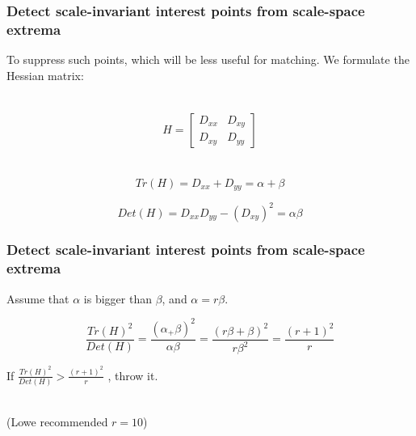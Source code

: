 \documentclass[notheorems, serif, table, compress]{beamer}  %
\begin{document}
\begin{frame}[fragile]
\frametitle{Detect scale-invariant interest points from scale-space extrema}%
To suppress such points, which will be less useful for matching. We formulate the Hessian matrix:

\quad\\ 

\begin{gather*}
H=
\begin{bmatrix}
D_{xx} & D_{xy}\\
D_{xy} & D_{yy}
\end{bmatrix}
\end{gather*}

\quad \\

\begin{equation}
Tr(H)=D_{xx}+D_{yy}=\alpha +\beta 
\end{equation}

\begin{equation}
Det(H)=D_{xx}D_{yy}-(D_{xy})^{2}=\alpha \beta
\end{equation}
\end{frame}
\begin{frame}[fragile]
\frametitle{Detect scale-invariant interest points from scale-space extrema}%
Assume that $\alpha$ is bigger than $\beta$, and $\alpha =r\beta$.

\begin{equation}
\frac{Tr(H)^{2}}{Det(H)}=\frac{(\alpha_ +\beta)^{2}}{\alpha \beta}=\frac{(r\beta +\beta)^{2}}{r\beta^{2}}=\frac{(r+1)^{2}}{r}
\end{equation}


If
$\frac{Tr(H)^{2}}{Det(H)}>\frac{(r+1)^{2}}{r}$
, throw it.

\quad\\
(Lowe recommended $r=10$)
\end{frame}
\end{document}
